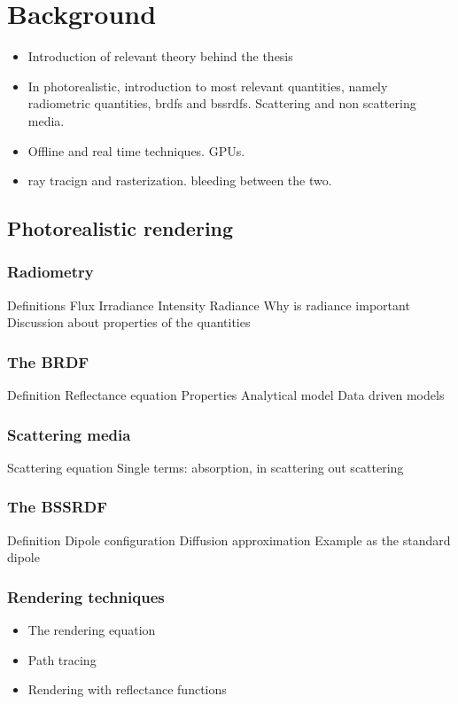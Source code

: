 \chapter{Background}
\begin{itemize}
\item Introduction of relevant theory behind the thesis
\item In photorealistic, introduction to most relevant quantities, namely radiometric quantities, brdfs and bssrdfs. Scattering and non scattering media.
\item Offline and real time techniques. GPUs. 
\item ray tracign and rasterization. bleeding between the two.
\end{itemize}

\section{Photorealistic rendering}

\subsection{Radiometry}
Definitions
Flux
Irradiance
Intensity 
Radiance
Why is radiance important
Discussion about properties of the quantities

\subsection{The BRDF}
Definition
Reflectance equation
Properties
Analytical model
Data driven models

\subsection{Scattering media}
Scattering equation
Single terms: absorption, in scattering out scattering

\subsection{The BSSRDF}
Definition
Dipole configuration
Diffusion approximation
Example as the standard dipole

\subsection{Rendering techniques}
\begin{itemize}
\item The rendering equation
\item Path tracing
\item Rendering with reflectance functions
\end{itemize}

